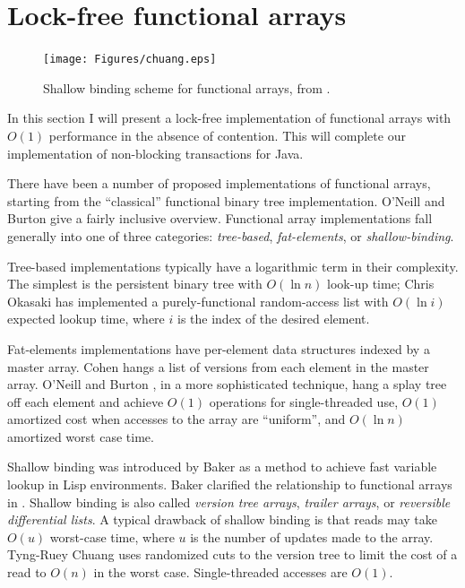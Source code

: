\section{Lock-free functional arrays}\label{sec:large-obj}
\begin{figure}\centering
\texttt{[image: Figures/chuang.eps]}
\caption{Shallow binding scheme for functional arrays, from
  \cite[Figure~1]{Chuang94}.}
\label{fig:chuang}
\end{figure}
In this section I will present a lock-free implementation of functional
arrays with $O(1)$ performance in the absence of contention.  This
will complete our implementation of non-blocking transactions for Java.

There have been a number of proposed implementations of functional
arrays, starting from the ``classical'' functional binary tree
implementation.  O'Neill and Burton \cite{ONeillBu97} give a fairly
inclusive overview.  Functional array implementations fall generally
into one of three categories: \emph{tree-based}, \emph{fat-elements},
or \emph{shallow-binding}.

Tree-based implementations typically have a logarithmic term in their
complexity.  The simplest is the persistent binary tree with $O(\ln
n)$ look-up time; Chris Okasaki 
\cite{Okasaki95} has implemented a purely-functional random-access list
with $O(\ln i)$ expected lookup time, where $i$ is the index of the
desired element.

Fat-elements implementations have per-element data structures indexed
by a master array. Cohen \cite{Cohen84} hangs a list of
versions from each element in the master array.
O'Neill and Burton \cite{ONeillBu97}, in a more sophisticated
technique, hang a splay tree off each element and achieve $O(1)$
operations for single-threaded use, $O(1)$ amortized cost when
accesses to the array are ``uniform'', and $O(\ln n)$ amortized worst
case time. 

Shallow binding was introduced by Baker \cite{Baker78} as a method to
achieve fast variable lookup in Lisp environments.  Baker clarified
the relationship to functional arrays in \cite{Baker91}.  Shallow
binding is also called \emph{version tree arrays}, \emph{trailer
  arrays}, or \emph{reversible differential lists}.  A typical
drawback of shallow binding is that reads may take $O(u)$ worst-case
time, where $u$ is the number of updates made to the array.  Tyng-Ruey
Chuang \cite{Chuang94} uses randomized cuts to the version tree to limit
the cost of a read to $O(n)$ in the worst case.  Single-threaded
accesses are $O(1)$.

